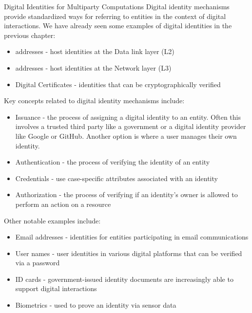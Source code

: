 \label{thesis__025-identity.md}
\begin{block}{Digital Identities for Multiparty Computations}
\label{thesis__025-identity.md__digital-identities-for-multiparty-computations}
Digital identity mechanisms provide standardized ways for referring to entities in the context of digital interactions. We have already seen some examples of digital identities in the previous chapter:

\begin{itemize}
\tightlist
\item
   addresses - host identities at the Data link layer (L2)
\item
   addresses - host identities at the Network layer (L3)
\item
  Digital Certificates - identities that can be cryptographically verified
\end{itemize}

Key concepts related to digital identity mechanisms include:

\begin{itemize}
\tightlist
\item
  Issuance - the process of assigning a digital identity to an entity. Often this involves a trusted third party like a government or a digital identity provider like Google or GitHub. Another option is  where a user manages their own identity.
\item
  Authentication - the process of verifying the identity of an entity
\item
  Credentials - use case-specific attributes associated with an identity
\item
  Authorization - the process of verifying if an identity's owner is allowed to perform an action on a resource
\end{itemize}

Other notable examples include:

\begin{itemize}
\tightlist
\item
  Email addresses - identities for entities participating in email communications
\item
  User names - user identities in various digital platforms that can be verified via a password
\item
  ID cards - government-issued identity documents are increasingly able to support digital interactions
\item
  Biometrics - used to prove an identity via sensor data
\end{itemize}


\end{block}
